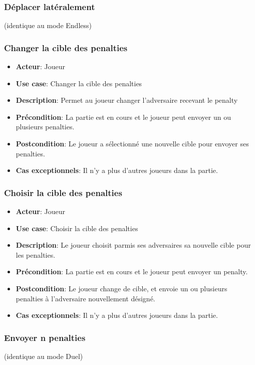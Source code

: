 \documentclass{article}
\begin{document}
\subsubsection*{Déplacer latéralement} (identique au mode Endless)

\subsubsection*{Changer la cible des penalties}
\begin{itemize}
    \item \textbf{Acteur}: Joueur
    \item \textbf{Use case}: Changer la cible des penalties
    \item \textbf{Description}: Permet au joueur changer l'adversaire recevant le penalty
    \item \textbf{Précondition}: La partie est en cours et le joueur peut envoyer un ou plusieurs penalties.
    \item \textbf{Postcondition}: Le joueur a sélectionné une nouvelle cible pour envoyer ses penalties.
    \item \textbf{Cas exceptionnels}: Il n'y a plus d'autres joueurs dans la partie.
\end{itemize}

\subsubsection*{Choisir la cible des penalties}
\begin{itemize}
    \item \textbf{Acteur}: Joueur
    \item \textbf{Use case}: Choisir la cible des penalties
    \item \textbf{Description}: Le joueur choisit parmis ses adversaires sa nouvelle cible pour les penalties.
    \item \textbf{Précondition}: La partie est en cours et le joueur peut envoyer un penalty.
    \item \textbf{Postcondition}: Le joueur change de cible, et envoie un ou plusieurs penalties à l’adversaire nouvellement désigné.
    \item \textbf{Cas exceptionnels}: Il n'y a plus d'autres joueurs dans la partie.
\end{itemize}

\subsubsection*{Envoyer n penalties} (identique au mode Duel)
\end{document}

